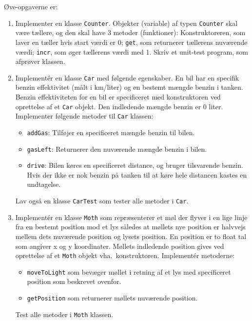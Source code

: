 \documentclass[a4paper,12pt]{article}
\begin{document}
Øve-opgaverne er:
\begin{enumerate}[label=10ø.\arabic*,start=0]
\item Implementer en klasse \texttt{Counter}. Objekter (variable) af typen \texttt{Counter} skal være tællere, og den skal have 3 metoder (funktioner): Konstruktoreren, som laver en tæller hvis start værdi er 0; \texttt{get}, som returnerer tællerens nuværende værdi; \texttt{incr}, som øger tællerens værdi med 1. Skriv et unit-test program, som afprøver klassen.
\item Implementér en klasse \texttt{Car} med følgende egenskaber. En bil har en specifik benzin effektivitet (målt i km/liter) og en bestemt mængde benzin i tanken. Benzin effektiviteten for en bil er specificeret med konstruktoren ved oprettelse af et \texttt{Car} objekt. Den indledende mængde benzin er 0 liter. Implementer følgende metoder til \texttt{Car} klassen:
    \begin{itemize}
    \item \texttt{addGas}: Tilføjer en specificeret mængde benzin til bilen.
    \item \texttt{gasLeft}: Returnerer den nuværende mængde benzin i bilen.
    \item \texttt{drive}: Bilen køres en specificeret distance, og bruger tilsvarende benzin. Hvis der ikke er nok benzin på tanken til at køre hele distancen kastes en undtagelse.
    \end{itemize}
    Lav også en klasse \texttt{CarTest} som tester alle metoder i \texttt{Car}.

\item Implementér en klasse \texttt{Moth} som repræsenterer et møl der flyver i en lige linje fra en bestemt position mod et lys således at møllets nye position er halvvejs mellem dets nuværende position og lysets position.  En position er to float tal som angiver x og y koordinater. Møllets indledende position gives ved oprettelse af et \texttt{Moth} objekt vha.\ konstruktoren.  Implementér metoderne:
  \begin{itemize}
\item \texttt{moveToLight} som bevæger møllet i retning af et lys med specificeret position som beskrevet ovenfor.
\item \texttt{getPosition} som returnerer møllets nuværende position.
\end{itemize}
Test alle metoder i \texttt{Moth} klassen.


\end{enumerate}
\end{document}
